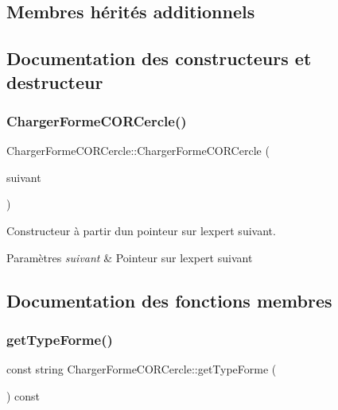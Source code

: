 \subsection*{Membres hérités additionnels}


\subsection{Documentation des constructeurs et destructeur}
\mbox{\label{class_charger_forme_c_o_r_cercle_aa014ab64f0a6c59c9e6d0148ec889e23}} 
\subsubsection{\texorpdfstring{ChargerFormeCORCercle()}{ChargerFormeCORCercle()}}
{\footnotesize\ttfamily Charger\+Forme\+C\+O\+R\+Cercle\+::\+Charger\+Forme\+C\+O\+R\+Cercle (\begin{DoxyParamCaption}\item[{\mbox{\hyperlink{class_charger_forme_c_o_r}{Charger\+Forme\+C\+OR}} $\ast$}]{suivant }\end{DoxyParamCaption})}



Constructeur à partir d\textquotesingle{}un pointeur sur l\textquotesingle{}expert suivant. 


\begin{DoxyParams}{Paramètres}
{\em suivant} & Pointeur sur l\textquotesingle{}expert suivant \\
\hline
\end{DoxyParams}


\subsection{Documentation des fonctions membres}
\mbox{\label{class_charger_forme_c_o_r_cercle_a4ca5a036a26641c2636d376f51659172}} 
\subsubsection{\texorpdfstring{getTypeForme()}{getTypeForme()}}
{\footnotesize\ttfamily const string Charger\+Forme\+C\+O\+R\+Cercle\+::get\+Type\+Forme (\begin{DoxyParamCaption}{ }\end{DoxyParamCaption}) const\hspace{0.3cm}{\ttfamily [virtual]}}



